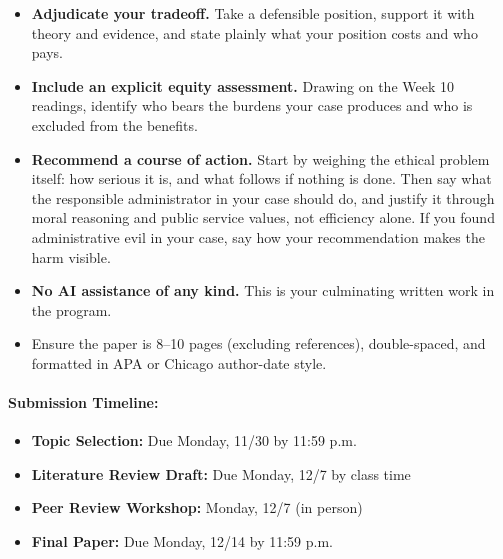 \documentclass[11pt]{article}     %
\begin{document}
\begin{enumerate}
\begin{itemize}
        \item \textbf{Adjudicate your tradeoff.} Take a defensible position, support it with theory and evidence, and state plainly what your position costs and who pays.
        \item \textbf{Include an explicit equity assessment.} Drawing on the Week 10 readings, identify who bears the burdens your case produces and who is excluded from the benefits.
        \item \textbf{Recommend a course of action.} Start by weighing the ethical problem itself: how serious it is, and what follows if nothing is done. Then say what the responsible administrator in your case should do, and justify it through moral reasoning and public service values, not efficiency alone. If you found administrative evil in your case, say how your recommendation makes the harm visible.
        \item \textbf{No AI assistance of any kind.} This is your culminating written work in the program.
        \item Ensure the paper is 8--10 pages (excluding references), double-spaced, and formatted in APA or Chicago author-date style.
    \end{itemize}
\end{enumerate}

\paragraph*{Submission Timeline:}
\begin{itemize}
    \item \textbf{Topic Selection:} Due Monday, 11/30 by 11:59 p.m.
    \item \textbf{Literature Review Draft:} Due Monday, 12/7 by class time
    \item \textbf{Peer Review Workshop:} Monday, 12/7 (in person)
    \item \textbf{Final Paper:} Due Monday, 12/14 by 11:59 p.m.
\end{itemize}
\end{document}
